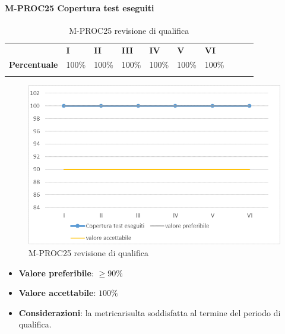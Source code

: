 \paragraph{M-PROC25 Copertura test eseguiti} \mbox{}
\begin{longtable}[H!] {						
		>{}p{50mm}  		
		>{}p{8mm}
		>{}p{8mm}		
		>{}p{8mm}		
		>{}p{8mm}		
		>{}p{8mm}		
		>{}p{8mm}
		>{}p{8mm}
		>{}p{8mm}
		>{}p{8mm}
	}
	\rowcolor{gray!50}
	\textbf{} & \textbf{I} & \textbf{II} & \textbf{III} & \textbf{IV} & \textbf{V} & \textbf{VI} \TBstrut \\ [2mm]
	\textbf{Percentuale} & 100\% & 100\% & 100\% & 100\% & 100\% & 100\% \TBstrut \\ [2mm]
	\rowcolor{white}
	\caption{M-PROC25 revisione di qualifica}
\end{longtable}
\begin{figure}[H] 	
	\includegraphics[width=\linewidth]{./img/grafici/RQ25.png}	
	\caption{M-PROC25 revisione di qualifica}	
\end{figure}
\begin{itemize}
	\item \textbf{Valore preferibile}: $\ge 90\%$
	\item \textbf{Valore accettabile}: $100\%$
	\item \textbf{Considerazioni}: la metrica\glosp risulta soddisfatta al termine del periodo di qualifica.
\end{itemize}

